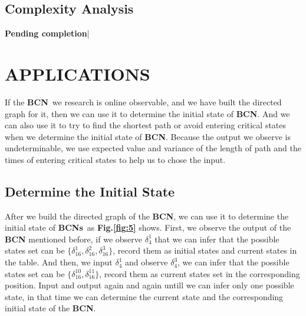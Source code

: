 \documentclass[letterpaper, 10 pt, conference]{ieeeconf}  %
\def \BCN {{\bf BCN}}
\def \BCNs {{\bf BCNs}}
\begin{document}
\subsection{Complexity Analysis}
{\bf Pending completion}|

\section{APPLICATIONS}

If the \BCN\ we research is online observable, and we have built the directed graph for it, then we can use  it to determine the initial state of {\bf BCN}. And we can also use it to try to find the shortest path or avoid entering critical states when we determine the initial state of {\bf BCN}. Because the output we observe is undeterminable, we use expected value and variance of the length of path and the times of entering critical states to help us to chose the input.

\subsection{Determine the Initial State}

After we build the directed graph of the {\bf BCN}, we can use it to determine the initial state of \BCNs\ as {\bf Fig.\ref{fig:5}} shows. First, we observe the output of the {\bf BCN} mentioned before, if we observe $\delta_4^1$ that we can infer that the possible states set can be $\{\delta_{16}^1,\delta_{16}^2,\delta_{16}^3\}$, record them as initial states and current states in the table. And then, we input  $\delta_4^1$ and observe  $\delta_4^3$, we can infer that the possible states set can be $\{\delta_{16}^{10},\delta_{16}^{11}\}$, record them as current states set in the corresponding position. Input and output again and again untill we can infer only one  possible state, in that time we can determine the current state and the corresponding initial state of the {\bf BCN}.
\end{document}
